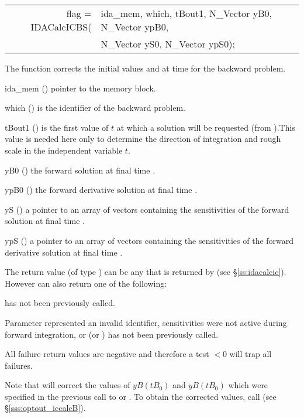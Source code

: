 {
  \begin{tabular}[t]{@{}r@{}l@{}}
  flag = IDACalcICBS(&ida\_mem, which, tBout1, N\_Vector yB0, N\_Vector ypB0, \\
                     &N\_Vector yS0, N\_Vector ypS0);
  \end{tabular}
}
{
  The function  corrects the initial values  and  at
  time  for the backward problem.
}
{
  \begin{args}
  \item[ida\_mem] ()
    pointer to the {\idas} memory block.
  \item[which] ()
    is the identifier of the backward problem.
  \item[tBout1] ()
    is the first value of $t$ at which a solution will be requested (from
    ).This value is needed here only to determine the direction of
    integration and rough scale in the independent variable $t$.   
  \item[yB0] ()
    the forward solution at final time .
  \item[ypB0] ()
    the forward derivative solution at final time .
  \item[yS]  ()
    a pointer to an array of  vectors containing the sensitivities of 
    the forward solution at final time .
  \item[ypS]  ()
    a pointer to an array of  vectors containing the sensitivities of 
    the forward derivative solution at final time .

  \end{args}
}
{
  The return value  (of type ) can be any that is returned by 
   (see \S\ref{ss:idacalcic}). However  can also 
  return one of the following:

  \begin{args}
  \item[\Id{IDA\_NO\_ADJ}]
     has not been previously called.
  \item[\id{IDA\_ILL\_INPUT}]
    Parameter  represented an invalid identifier, sensitivities were
    not active during forward integration, or  (or )
    has not been previously called.
  \end{args} 
}
{
  All failure return values are negative and therefore a test  $< 0$
  will trap all  failures.

  Note that  will correct the values of $yB(tB_0)$ and 
  $\dot{y}B(tB_0)$ which were specified in the previous call to  
  or . To obtain the corrected values, call 
   (see \S\ref{sss:optout_iccalcB}).
}



